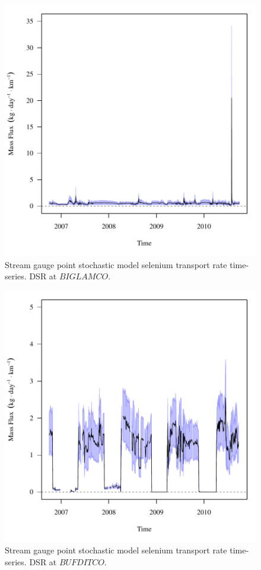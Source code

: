 \begin{figure}[htbp]
	\begin{center}
	\includegraphics[width=6in]{"Figures/Results_DSR/f BIG"}
	\caption{Stream gauge point stochastic model selenium transport rate time-series.  DSR at $BIGLAMCO$.}
	\end{center}
\end{figure}
\newpage

\begin{figure}[htbp]
	\begin{center}
	\includegraphics[width=6in]{"Figures/Results_DSR/f BUF"}
	\caption{Stream gauge point stochastic model selenium transport rate time-series.  DSR at $BUFDITCO$.}
	\end{center}
\end{figure}
\newpage

